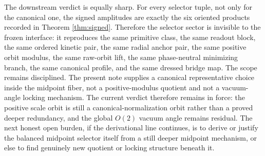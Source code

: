 \documentclass[11pt]{article}
\begin{document}
The downstream verdict is equally sharp. For every selector tuple, not only for the canonical one, the signed amplitudes are exactly the six oriented products recorded in Theorem \ref{thm:signed}. Therefore the selector sector is invisible to the frozen interface: it reproduces the same primitive class, the same readout block, the same ordered kinetic pair, the same radial anchor pair, the same positive orbit modulus, the same raw-orbit lift, the same phase-neutral minimizing branch, the same canonical profile, and the same dressed bridge map. The scope remains disciplined. The present note supplies a canonical representative choice inside the midpoint fiber, not a positive-modulus quotient and not a vacuum-angle locking mechanism. The current verdict therefore remains in force: the positive scale orbit is still a canonical-normalization orbit rather than a proved deeper redundancy, and the global \(O(2)\) vacuum angle remains residual. The next honest open burden, if the derivational line continues, is to derive or justify the balanced midpoint selector itself from a still deeper midpoint mechanism, or else to find genuinely new quotient or locking structure beneath it.
\end{document}

